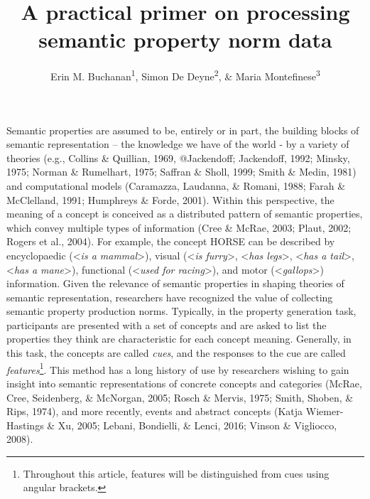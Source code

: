 \documentclass[man]{apa6}
\title{A practical primer on processing semantic property norm data}
\author{Erin M. Buchanan\textsuperscript{1}, Simon De Deyne\textsuperscript{2}, \& Maria Montefinese\textsuperscript{3}}
\date{}
\affiliation{
\vspace{0.5cm}
\textsuperscript{1} Harrisburg University of Science and Technology\\\textsuperscript{2} The University of Melbourne\\\textsuperscript{3} University of Padua}
\let\rmarkdownfootnote\footnote%
\def\footnote{\protect\rmarkdownfootnote}
\begin{document}
\maketitle

Semantic properties are assumed to be, entirely or in part, the building blocks of semantic representation -- the knowledge we have of the world - by a variety of theories (e.g., Collins \& Quillian, 1969, @Jackendoff; Jackendoff, 1992; Minsky, 1975; Norman \& Rumelhart, 1975; Saffran \& Sholl, 1999; Smith \& Medin, 1981) and computational models (Caramazza, Laudanna, \& Romani, 1988; Farah \& McClelland, 1991; Humphreys \& Forde, 2001). Within this perspective, the meaning of a concept is conceived as a distributed pattern of semantic properties, which convey multiple types of information (Cree \& McRae, 2003; Plaut, 2002; Rogers et al., 2004). For example, the concept HORSE can be described by encyclopaedic (\textless{}\emph{is a mammal}\textgreater{}), visual (\textless{}\emph{is furry}\textgreater{}, \textless{}\emph{has legs}\textgreater{}, \textless{}\emph{has a tail}\textgreater{}, \textless{}\emph{has a mane}\textgreater{}), functional (\textless{}\emph{used for racing}\textgreater{}), and motor (\textless{}\emph{gallops}\textgreater{}) information. Given the relevance of semantic properties in shaping theories of semantic representation, researchers have recognized the value of collecting semantic property production norms. Typically, in the property generation task, participants are presented with a set of concepts and are asked to list the properties they think are characteristic for each concept meaning. Generally, in this task, the concepts are called \emph{cues}, and the responses to the cue are called \emph{features}\footnote{Throughout this article, features will be distinguished from cues using angular brackets.}. This method has a long history of use by researchers wishing to gain insight into semantic representations of concrete concepts and categories (McRae, Cree, Seidenberg, \& McNorgan, 2005; Rosch \& Mervis, 1975; Smith, Shoben, \& Rips, 1974), and more recently, events and abstract concepts (Katja Wiemer-Hastings \& Xu, 2005; Lebani, Bondielli, \& Lenci, 2016; Vinson \& Vigliocco, 2008).
\end{document}
